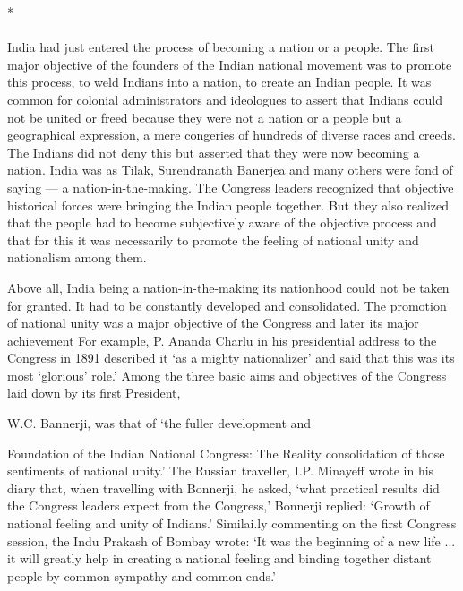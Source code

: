 \begin{center}*\end{center}

\paragraph*{}


India had just entered the process of becoming a nation or a people. The first major objective of the founders of the Indian national movement was to promote this process, to weld Indians into a nation, to create an Indian people. It was common for colonial administrators and ideologues to assert that Indians could not be united or freed because they were not a nation or a people but a geographical expression, a mere congeries of hundreds of diverse races and creeds. The Indians did not deny this but asserted that they were now becoming a nation. India was as Tilak, Surendranath Banerjea and many others were fond of saying — a nation-in-the-making. The Congress leaders recognized that objective historical forces were bringing the Indian people together. But they also realized that the people had to become subjectively aware of the objective process and that for this it was necessarily to promote the feeling of national unity and nationalism among them.

Above all, India being a nation-in-the-making its nationhood could not be taken for granted. It had to be constantly developed and consolidated. The promotion of national unity was a major objective of the Congress and later its major achievement For example, P. Ananda Charlu in his presidential address to the Congress in 1891 described it `as a mighty nationalizer' and said that this was its most `glorious' role.' Among the three basic aims and objectives of the Congress laid down by its first President,

W.C. Bannerji, was that of `the fuller development and

Foundation of the Indian National Congress: The Reality consolidation of those sentiments of national unity.' The Russian traveller, I.P. Minayeff wrote in his diary that, when travelling with Bonnerji, he asked, `what practical results did the Congress leaders expect from the Congress,' Bonnerji replied: `Growth of national feeling and unity of Indians.' Similai.ly commenting on the first Congress session, the Indu Prakash of Bombay wrote: `It was the beginning of a new life ... it will greatly help in creating a national feeling and binding together distant people by common sympathy and common ends.'

